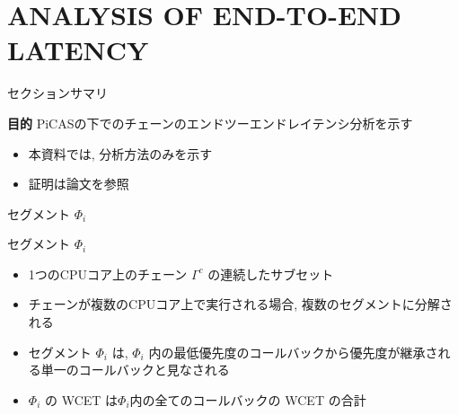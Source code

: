 
\section{ANALYSIS OF END-TO-END LATENCY}
\label{sec: analysis of end-to-end latency}

\begin{frame}{セクションサマリ}
    \begin{itembox}[l]{\textbf{目的}}
        PiCASの下でのチェーンのエンドツーエンドレイテンシ分析を示す
    \end{itembox}
\end{frame}

\begin{frame}{}
    \begin{itemize}
        \item 本資料では, 分析方法のみを示す
        \item 証明は論文を参照
    \end{itemize}
\end{frame}

\begin{frame}{セグメント $\Phi_i$}
    \begin{block}{セグメント $\Phi_i$}
        \begin{itemize}
            \item 1つのCPUコア上のチェーン $\Gamma^{c}$ の連続したサブセット
            \item チェーンが複数のCPUコア上で実行される場合, 複数のセグメントに分解される
            \item セグメント $\Phi_{i}$ は, $\Phi_{i}$ 内の最低優先度のコールバックから優先度が継承される単一のコールバックと見なされる
            \item $\Phi_{i}$ の WCET は$\Phi_{i}$内の全てのコールバックの WCET の合計
        \end{itemize}
    \end{block}
\end{frame}

